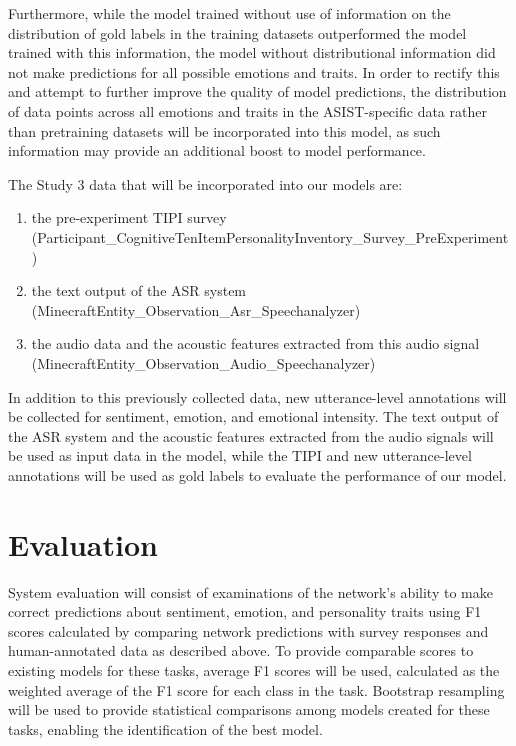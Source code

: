 \documentclass[11pt]{article}
\begin{document}
Furthermore, while the model trained without use of information on the distribution
of gold labels in the training datasets outperformed the model trained with this
information, the model without distributional information did not make predictions
for all possible emotions and traits. In order to rectify this and attempt to
further improve the quality of model predictions, the distribution of data points
across all emotions and traits in the ASIST-specific data rather than pretraining
datasets will be incorporated into this model, as such information may provide an
additional boost to model performance.

The Study 3 data that will be incorporated into our models are:

\begin{enumerate}
    \item the
pre-experiment TIPI survey \\
(Participant\_CognitiveTenItemPersonalityInventory\_Survey\_PreExperiment)
    \item the
text output of the ASR system \\
(MinecraftEntity\_Observation\_Asr\_Speechanalyzer)
    \item the audio data and the
acoustic features extracted from this audio signal
(MinecraftEntity\_Observation\_Audio\_Speechanalyzer)
\end{enumerate}

In addition to this previously collected data, new
utterance-level annotations will be collected for sentiment, emotion, and
emotional intensity. The text output of the ASR system and the acoustic features
extracted from the audio signals will be used as input data in the model,
while the TIPI and new utterance-level annotations will be used as gold labels
to evaluate the performance of our model.

\section{Evaluation}

System evaluation will consist of examinations of the network's ability to make
correct predictions about sentiment, emotion, and personality traits using F1
scores calculated by comparing network predictions with survey responses and
human-annotated data as described above. To provide comparable scores to
existing models for these tasks, average F1 scores will be used, calculated as
the weighted average of the F1 score for each class in the task.  Bootstrap
resampling \cite{kohavi1995study} will be used to provide statistical
comparisons among models created for these tasks, enabling the identification
of the best model.
\end{document}
